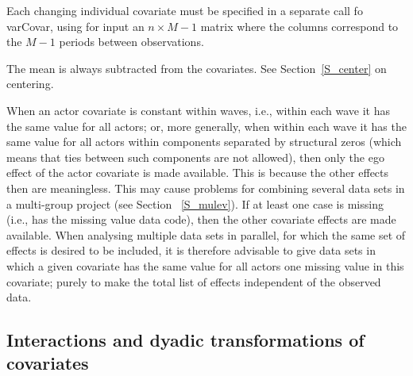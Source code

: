 \documentclass[a4paper,fleqn,11pt]{article}
\newcommand{\+}{\, + \,}
\newcommand{\sfn}[1]{\textsf{#1}}
\begin{document}
{Each changing individual covariate must be specified
in a separate call fo \sfn{varCovar}, using for input
an $n \times M-1$ matrix where the columns correspond to the $M-1$ periods
between observations.

The mean is always subtracted from the covariates.
See Section~\ref{S_center} on centering.

When an actor covariate is constant within waves, i.e.,
within each wave it has the same value for all actors;
or, more generally, when within each wave it has the same value for
all actors
within components separated by structural zeros (which means that
ties between such components are not allowed), then only the ego effect
of the actor covariate is made available.
This is because the other effects then are meaningless.
This may cause problems for combining several data sets
in a multi-group project (see Section ~\ref{S_mulev}).
If at least one case is missing (i.e., has the missing value data code),
then the other covariate effects are made available.
When analysing multiple data sets in parallel,
for which the same set of effects is desired to be included,
it is therefore advisable to give data sets in which
a given covariate has the same value for all actors
one missing value in this covariate; purely to make
the total list of effects independent of the observed data.


\subsection{Interactions and dyadic transformations of covariates}

}
\end{document}
